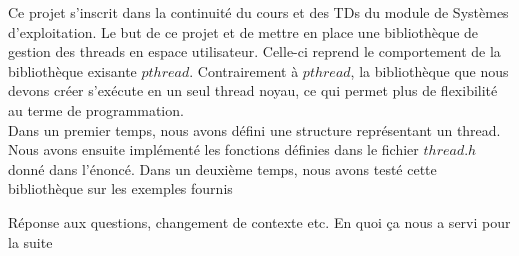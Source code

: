 Ce projet s'inscrit dans la continuité du cours et des TDs du module de Systèmes d'exploitation. Le but de ce projet et de mettre en place une bibliothèque de gestion des threads en espace utilisateur. Celle-ci reprend le comportement de la bibliothèque exisante $pthread$. Contrairement à $pthread$, la bibliothèque que nous devons créer s'exécute en un seul thread noyau, ce qui permet plus de flexibilité au terme de programmation. \\
\indent Dans un premier temps, nous avons défini une structure représentant un thread. Nous avons ensuite implémenté les fonctions définies dans le fichier $thread.h$ donné dans l'énoncé. Dans un deuxième temps, nous avons testé cette bibliothèque sur les exemples fournis

Réponse aux questions, changement de contexte etc.
En quoi ça nous a servi pour la suite
